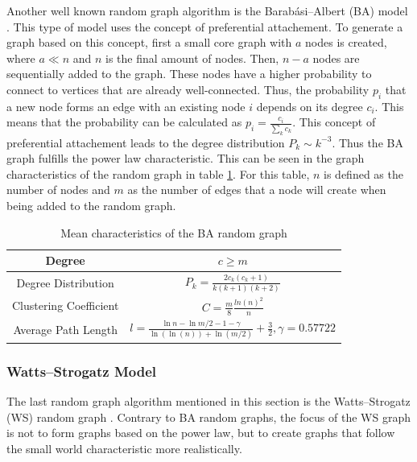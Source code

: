 Another well known random graph algorithm is the Barabási–Albert (BA) model 
\cite{barabasimodel}. 
This type of model uses the concept of preferential attachement.
To generate a graph based on this concept, first a small \glqq core\grqq{}
graph with $a$ nodes is created, where $a\ll n$ and $n$ is the final amount of nodes.
Then, $n-a$ nodes are sequentially added to the graph.
These nodes have a higher 
probability to connect to vertices that are already well-connected. 
Thus, the probability $p_i$ that a new node forms an edge with an
existing node $i$ depends on its degree $c_i$. This means that the
probability can be calculated as $p_i= \frac{c_i}{\sum_{k}c_k}$.
This concept of preferential attachement leads to the degree distribution
$P_k\sim k^{-3}$. Thus the BA graph 
fulfills the power law characteristic.
This can be seen in the graph characteristics of the random graph
in table \ref{ba-model}. For this table, $n$ is defined as the number
of nodes and $m$ as the number of edges that a node
will create when being added to the random graph.

\begin{table}[ht!]
    \centering
    \begin{tabular}{|c | c |} 
     \hline
     Degree & $c\geq m$ \\ 
     \hline
     Degree Distribution & 
     $P_k = \frac{2c_k(c_k+1)}{k(k+1)(k+2)}$ \\ 
     \hline
     Clustering Coefficient \cite{ba_cluster_coeff} & 
     $C=\frac{m}{8}\frac{ln(n)^2}{n}$ \\ 
     \hline
     Average Path Length \cite{averagepath}& 
     $l = \frac{\ln{n}- \ln{m/2} - 1 - \gamma}{\ln(\ln(n))+\ln{(m/2)}} + \frac{3}{2}, 
     \gamma=0.57722$ \\ 
     \hline
    \end{tabular}
    \caption{Mean characteristics of the BA random graph \cite{basicnetwork}}
    \label{ba-model}
\end{table}

\subsubsection{Watts–Strogatz Model}
The last random graph algorithm mentioned in this section 
is the Watts–Strogatz (WS) random graph \cite{wattsmodel}.
Contrary to BA random graphs, the focus of the WS graph is not to 
form graphs based on the power law, but to create graphs
that follow the small world characteristic more realistically.

